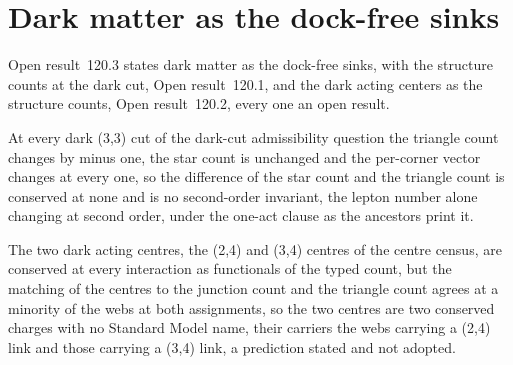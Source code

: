 \section{Dark matter as the dock-free sinks}\label{mod:X-7-dark-matter-as-the-dock-free-sinks}
\label{narr:open:10-7}Open result~120.3 states dark matter as the dock-free sinks, with the structure counts at the dark cut, Open result~120.1, and the dark acting centers as the structure counts, Open result~120.2, every one an open result.
\begin{chwall}\label{box:X-7-dark-matter-as-the-dock-free-sinks:1}
At every dark (3,3) cut of the dark-cut admissibility question the triangle count changes by minus one, the star count is unchanged and the per-corner vector changes at every one, so the difference of the star count and the triangle count is conserved at none and is no second-order invariant, the lepton number alone changing at second order, under the one-act clause as the ancestors print it.
\end{chwall}
\begin{chwall}\label{box:X-7-dark-matter-as-the-dock-free-sinks:2}
The two dark acting centres, the (2,4) and (3,4) centres of the centre census, are conserved at every interaction as functionals of the typed count, but the matching of the centres to the junction count and the triangle count agrees at a minority of the webs at both assignments, so the two centres are two conserved charges with no Standard Model name, their carriers the webs carrying a (2,4) link and those carrying a (3,4) link, a prediction stated and not adopted.
\end{chwall}
